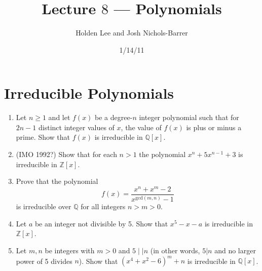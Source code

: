 
\pagestyle{fancy}





%
%

\title{Lecture $8$ --- Polynomials}%
\author{Holden Lee and Josh Nichols-Barrer}
\date{1/14/11}%
\maketitle
\thispagestyle{empty}



\section{Irreducible Polynomials}
\begin{enumerate}
\item  Let $n\geq 1$ and let $f(x)$ be a degree-$n$ integer polynomial such that for $2n-1$ distinct integer values of $x$, the value of $f(x)$ is plus or minus a prime. Show that $f(x)$ is irreducible in $\mathbb{Q}[x]$.
\item (IMO 1992?) Show that for each $n>1$ the polynomial $x^n+5x^{n-1}+3$ is irreducible in
$\mathbb Z[x]$.
\item Prove that the polynomial
\[f(x)=\frac{x^n+x^m-2}{x^{\text{gcd}(m,n)}-1}\]
is irreducible over $\mathbb Q$ for all integers $n>m>0$.
\item Let $a$ be an integer not divisible by 5.  Show that $x^5-x-a$
is irreducible in $\mathbb Z[x]$.
\item Let $m,n$ be integers with $m>0$ and $5\mid\mid n$ (in other words, $5|n$ and no larger power of 5 divides $n$). Show that $(x^4+x^2-6)^m+n$ is irreducible in $\mathbb{Q}[x]$.
\end{enumerate}

